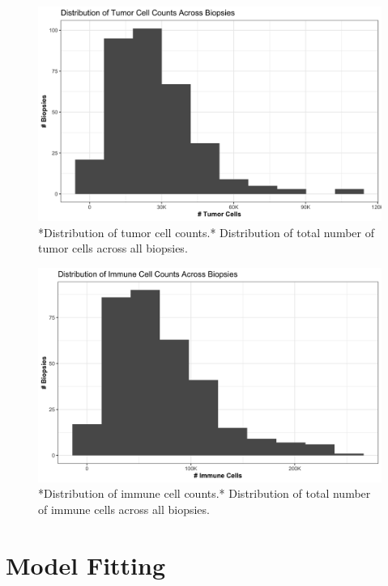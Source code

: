 \documentclass[
]{book}
\begin{document}
\begin{figure}

{\centering \includegraphics[width=1\linewidth]{Figures/n_tum} 

}

\caption{*Distribution of tumor cell counts.* Distribution of total number of tumor cells across all biopsies.}\label{fig:ntum}
\end{figure}

\begin{figure}

{\centering \includegraphics[width=1\linewidth]{Figures/n_imm} 

}

\caption{*Distribution of immune cell counts.* Distribution of total number of immune cells across all biopsies.}\label{fig:nimm}
\end{figure}

\hypertarget{model-fitting}{%
\chapter{Model Fitting}\label{model-fitting}}
\end{document}
